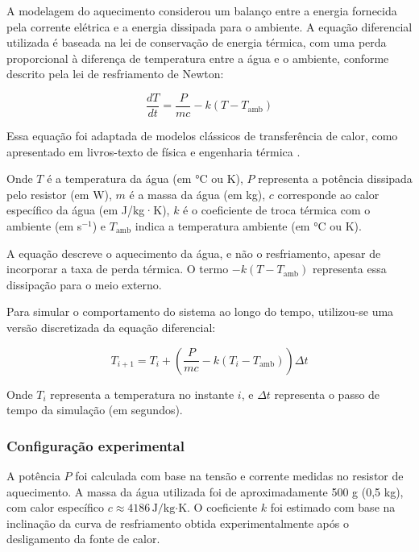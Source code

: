 \documentclass[conference]{IEEEtran}
\begin{document}
A modelagem do aquecimento considerou um balanço entre a energia fornecida pela corrente elétrica e a energia dissipada para o ambiente. A equação diferencial utilizada é baseada na lei de conservação de energia térmica, com uma perda proporcional à diferença de temperatura entre a água e o ambiente, conforme descrito pela lei de resfriamento de Newton:

\begin{equation}
    \frac{dT}{dt} = \frac{P}{mc} - k (T - T_{\text{amb}})
\end{equation}

Essa equação foi adaptada de modelos clássicos de transferência de calor, como apresentado em livros-texto de física e engenharia térmica \cite{hallidayresnickwalker2023}.

\noindent
Onde \(T\) é a temperatura da água (em °C ou K), \(P\) representa a potência dissipada pelo resistor (em W), \(m\) é a massa da água (em kg), \(c\) corresponde ao calor específico da água (em J/kg·K), \(k\) é o coeficiente de troca térmica com o ambiente (em s\(^{-1}\)) e \(T_{\text{amb}}\) indica a temperatura ambiente (em °C ou K).


A equação descreve o aquecimento da água, e não o resfriamento, apesar de incorporar a taxa de perda térmica. O termo $-k(T - T_{\text{amb}})$ representa essa dissipação para o meio externo.

Para simular o comportamento do sistema ao longo do tempo, utilizou-se uma versão discretizada da equação diferencial:

\begin{equation}
    T_{i+1} = T_i + \left(\frac{P}{mc} - k (T_i - T_{\text{amb}})\right) \Delta t
\end{equation}

\noindent
Onde $T_i$ representa a temperatura no instante $i$, e $\Delta t$ representa o passo de tempo da simulação (em segundos).

\subsubsection*{Configuração experimental}

A potência $P$ foi calculada com base na tensão e corrente medidas no resistor de aquecimento. A massa da água utilizada foi de aproximadamente 500 g (0,5 kg), com calor específico $c \approx 4186\, \text{J/kg·K}$. O coeficiente $k$ foi estimado com base na inclinação da curva de resfriamento obtida experimentalmente após o desligamento da fonte de calor.
\end{document}
